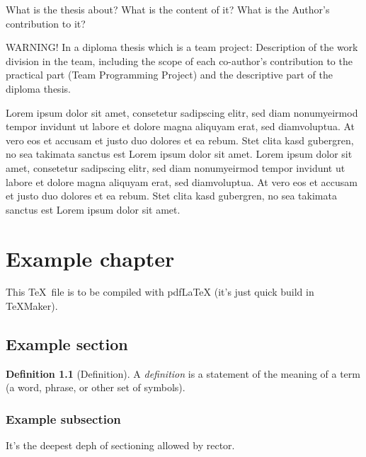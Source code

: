 \documentclass[a4paper,11pt,twoside]{report}
\theoremstyle{definition}
\newtheorem{definition}[theorem]{Definition}
\begin{document}
What is the thesis about? What is the content of it? What is the Author's contribution to it?
\par
WARNING!  In a diploma thesis which is a team project: Description of the work division in the team, including the scope of each co-author’s contribution to the practical part (Team Programming Project) and the descriptive part of the diploma thesis. 
\par

Lorem ipsum dolor sit amet, consetetur sadipscing elitr, sed diam nonumyeirmod tempor invidunt ut labore et dolore magna aliquyam erat, sed diamvoluptua. At vero eos et accusam et justo duo dolores et ea rebum. Stet clita kasd gubergren, no sea takimata sanctus est Lorem ipsum dolor sit amet. Lorem ipsum dolor sit amet, consetetur sadipscing elitr, sed diam nonumyeirmod tempor invidunt ut labore et dolore magna aliquyam erat, sed diamvoluptua. At vero eos et accusam et justo duo dolores et ea rebum. Stet clita kasd gubergren, no sea takimata sanctus est Lorem ipsum dolor sit amet.

\chapter{Example chapter}

This \TeX~file is to be compiled with pdfLaTeX (it's just quick build in TeXMaker).


\section{Example section}

\begin{definition}[Definition]
	A \emph{definition} is a statement of the meaning of a term (a word, phrase, or other set of symbols).
\end{definition}

\subsection{Example subsection}

It's the deepest deph of sectioning allowed by rector.
\end{document}
